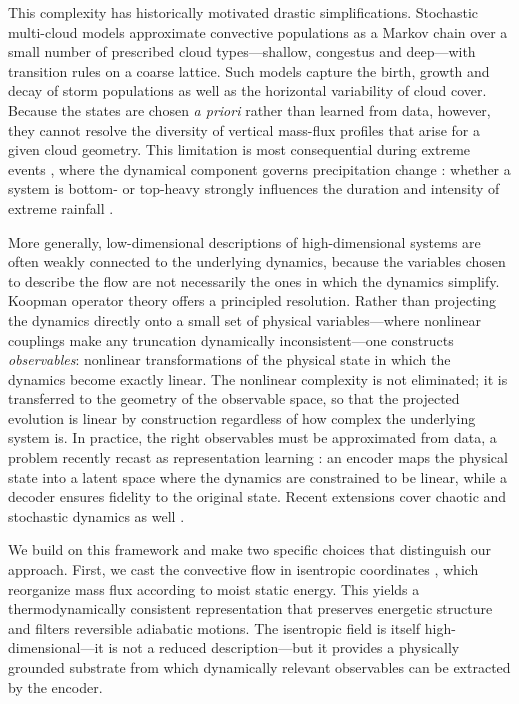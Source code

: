 \documentclass[11pt]{article}
\begin{document}
This complexity has historically motivated drastic simplifications. Stochastic multi-cloud models \citep{khouider2006multicloud, majda2008stochastic, khouider2010stochastic} approximate convective populations as a Markov chain over a small number of prescribed cloud types---shallow, congestus and deep---with transition rules on a coarse lattice. Such models capture the birth, growth and decay of storm populations as well as the horizontal variability of cloud cover. Because the states are chosen \emph{a priori} rather than learned from data, however, they cannot resolve the diversity of vertical mass-flux profiles that arise for a given cloud geometry. This limitation is most consequential during extreme events \citep{MullerYukari19}, where the dynamical component governs precipitation change \citep{singh2012upward, abramian2023extreme, wang2022convective}: whether a system is bottom- or top-heavy strongly influences the duration and intensity of extreme rainfall \citep{li2025bimodal}.

More generally, low-dimensional descriptions of high-dimensional systems are often weakly connected to the underlying dynamics, because the variables chosen to describe the flow are not necessarily the ones in which the dynamics simplify. Koopman operator theory \citep{koopman1931hamiltonian, brunton2021modern} offers a principled resolution. Rather than projecting the dynamics directly onto a small set of physical variables---where nonlinear couplings make any truncation dynamically inconsistent---one constructs \emph{observables}: nonlinear transformations of the physical state in which the dynamics become exactly linear. The nonlinear complexity is not eliminated; it is transferred to the geometry of the observable space, so that the projected evolution is linear by construction regardless of how complex the underlying system is. In practice, the right observables must be approximated from data, a problem recently recast as representation learning \citep{lusch2018deep}: an encoder maps the physical state into a latent space where the dynamics are constrained to be linear, while a decoder ensures fidelity to the original state. Recent extensions cover chaotic and stochastic dynamics as well \citep{nathaniel2026generative}.

We build on this framework and make two specific choices that distinguish our approach. First, we cast the convective flow in isentropic coordinates \citep{pauluis2013isentropic}, which reorganize mass flux according to moist static energy. This yields a thermodynamically consistent representation that preserves energetic structure and filters reversible adiabatic motions. The isentropic field is itself high-dimensional---it is not a reduced description---but it provides a physically grounded substrate from which dynamically relevant observables can be extracted by the encoder.
\end{document}

